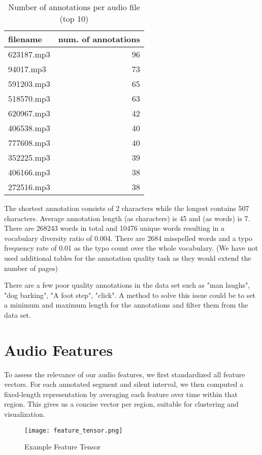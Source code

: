 \documentclass{article}
\begin{document}
\begin{table}[H]
  \caption{Number of annotations per audio file (top 10)}
  \label{tab:annot}
  \centering
  \begin{tabular}{lr}
    \toprule
    filename & num. of annotations \\
    \midrule
    623187.mp3 & 96 \\
    94017.mp3  & 73 \\
    591203.mp3 & 65 \\
    518570.mp3 & 63 \\
    620967.mp3 & 42 \\
    406538.mp3 & 40 \\
    777608.mp3 & 40 \\
    352225.mp3 & 39 \\
    406166.mp3 & 38 \\
    272516.mp3 & 38 \\
    \bottomrule
  \end{tabular}
\end{table}

The shortest annotation consists of 2 characters while the longest contains 507 characters. Average annotation length (as characters) is 45 and (as words) is 7. There are 268243 words in total and 10476 unique words resulting in a vocabulary diversity ratio of 0.004.
There are 2684 misspelled words and a typo frequency rate of 0.01 as the typo count over the whole vocabulary. (We have not used additional tables for the annotation quality task as they would extend the number of pages)

There are a few poor quality annotations in the data set such as "man laughs", "dog barking", "A foot step", "click". A method to solve this issue could be to set a minimum and maximum length for the annotations and filter them from the data set.

\section{Audio Features}
To assess the relevance of our audio features, we first standardized all feature vectors. For each annotated segment and silent interval, we then computed a fixed-length representation by averaging each feature over time within that region. This gives us a concise vector per region, suitable for clustering and visualization.

\begin{figure}[H]
    \centering
    \texttt{[image: feature\_tensor.png]}
    \caption{Example Feature Tensor}
    \label{fig:feature_tensor}
\end{figure}
\end{document}
